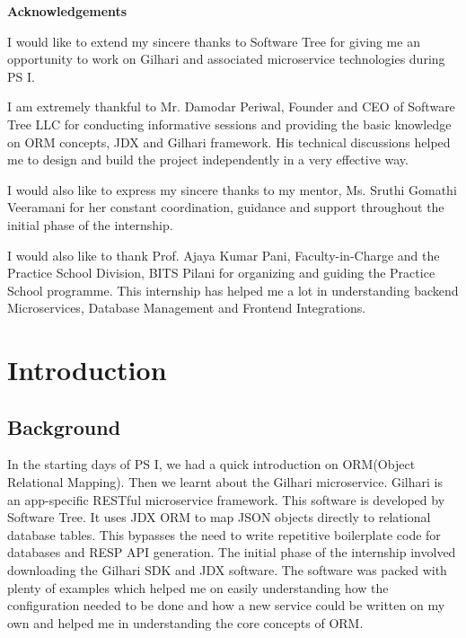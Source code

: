 \documentclass{book}
\begin{document}
	\newpage
	\centerline{\bf \Large Acknowledgements}
	\vspace*{0.5cm}
	
		\par\noindent I would like to extend my sincere thanks to Software Tree for giving me an opportunity to work on Gilhari and associated microservice technologies during PS I.
		
		\par\noindent I am extremely thankful to Mr. Damodar Periwal, Founder and CEO of Software Tree LLC for conducting informative sessions and providing the basic knowledge on ORM concepts, JDX and Gilhari framework. His technical discussions helped me to design and build the project independently in a very effective way.
		
		\par\noindent I would also like to express my sincere thanks to my mentor, Ms. Sruthi Gomathi Veeramani for her constant coordination, guidance and support throughout the initial phase of the internship.
		
		\par\noindent I would also like to thank Prof. Ajaya Kumar Pani, Faculty-in-Charge and the Practice School Division, BITS Pilani for organizing and guiding the Practice School programme. This internship has helped me a lot in understanding backend Microservices, Database Management and Frontend Integrations.
		
		\vfill

		\par{}

\tableofcontents
\listoffigures
\listoftables

\chapter{Introduction}
\section{Background}
In the starting days of PS I, we had a quick introduction on ORM(Object Relational Mapping). Then we learnt about the Gilhari microservice. Gilhari is an app-specific RESTful microservice framework. This software is developed by Software Tree. It uses JDX ORM to map JSON objects directly to relational database tables. This bypasses the need to write repetitive boilerplate code for databases and RESP API generation. The initial phase of the internship involved downloading the Gilhari SDK and JDX software. The software was packed with plenty of examples which helped me on easily understanding how the configuration needed to be done and how a new service could be written on my own and helped me in understanding the core concepts of ORM.
\end{document}
